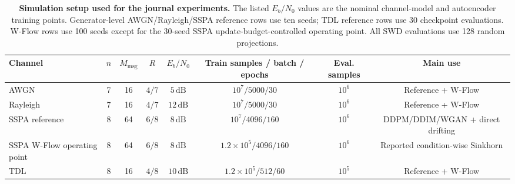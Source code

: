 \begin{table}[t]
\centering
\caption{\textbf{Simulation setup used for the journal experiments.} The listed \(E_b/N_0\) values are the nominal channel-model and autoencoder training points. Generator-level AWGN/Rayleigh/SSPA reference rows use ten seeds; TDL reference rows use 30 checkpoint evaluations. W-Flow rows use 100 seeds except for the 30-seed SSPA update-budget-controlled operating point. All SWD evaluations use 128 random projections.}
\label{tab:simulation-setup}
\tablefontsize
\begin{tabular}{@{}lccccccc@{}}
\toprule
Channel & \(n\) & \(M_{\mathrm{msg}}\) & \(R\) & \(E_b/N_0\) & Train samples / batch / epochs & Eval. samples & Main use \\
\midrule
AWGN & 7 & 16 & \(4/7\) & \(5\,\mathrm{dB}\) & \(10^7 / 5000 / 30\) & \(10^6\) & Reference + W-Flow \\
Rayleigh & 7 & 16 & \(4/7\) & \(12\,\mathrm{dB}\) & \(10^7 / 5000 / 30\) & \(10^6\) & Reference + W-Flow \\
SSPA reference & 8 & 64 & \(6/8\) & \(8\,\mathrm{dB}\) & \(10^7 / 4096 / 160\) & \(10^6\) & DDPM/DDIM/WGAN + direct drifting \\
SSPA W-Flow operating point & 8 & 64 & \(6/8\) & \(8\,\mathrm{dB}\) & \(1.2{\times}10^5 / 4096 / 160\) & \(10^6\) & Reported condition-wise Sinkhorn \\
TDL & 8 & 16 & \(4/8\) & \(10\,\mathrm{dB}\) & \(1.2{\times}10^5 / 512 / 60\) & \(10^5\) & Reference + W-Flow \\
\bottomrule
\end{tabular}
\end{table}
